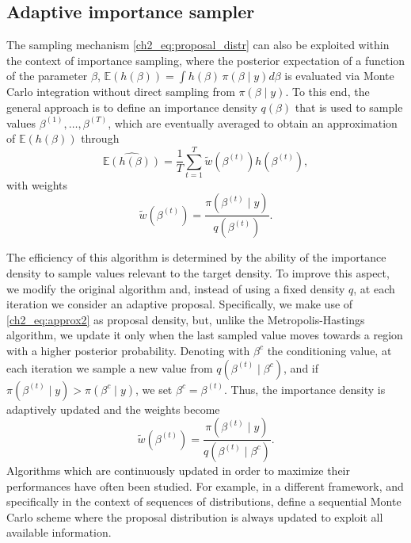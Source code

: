 \subsection{Adaptive importance sampler}
\label{ch2_sec:is}

The sampling mechanism \eqref{ch2_eq:proposal_distr} can also be exploited within the context of importance sampling, where the posterior expectation of a function of the parameter $\beta$, $\mathbb{E}\left( h(\beta) \right) = \int h(\beta)\, \pi(\beta \mid y) d\beta$ is evaluated via Monte Carlo integration without direct sampling from $\pi(\beta \mid y)$. To this end, the general approach is to define an importance density $q(\beta)$ that is used to sample values $\beta^{(1)}, \dots, \beta^{(T)}$, which are eventually averaged to obtain an approximation of $\mathbb{E}\left( h(\beta) \right)$ through
\[
\widehat{\mathbb{E}( h(\beta))} = \frac{1}{T} \sum_{t=1}^T \tilde{w}(\beta^{(t)}) h(\beta^{(t)}),
\]
with weights 
\begin{equation*}
\tilde{w}(\beta^{(t)}) = \frac{\pi(\beta^{(t)} \mid y)}{q(\beta^{(t)})}.
\end{equation*}

The efficiency of this algorithm is determined by the ability of the importance density to sample values relevant to the target density.
To improve this aspect, we modify the original algorithm and, instead of using a fixed density $q$, at each iteration we consider an adaptive proposal. Specifically, we make use of \eqref{ch2_eq:approx2} as proposal density, but, unlike the Metropolis-Hastings algorithm,  we update it only when the last sampled value moves towards a region with a higher posterior probability. Denoting with $\beta^{c}$ the conditioning value, at each iteration we sample a new value from $q(\beta^{(t)}\mid\beta^c)$, and if $\pi(\beta^{(t)}\mid y)>\pi(\beta^{c}\mid y)$, we set $\beta^{c} = \beta^{(t)}$. Thus, the importance density is adaptively updated and the weights become
\begin{equation*}
\tilde{w}(\beta^{(t)}) = \frac{\pi(\beta^{(t)} \mid y)}{q(\beta^{(t)} \mid \beta^{c})}.
\end{equation*}
Algorithms which are continuously updated in order to maximize their performances have often been studied. For example, in a different framework, and specifically in the context of sequences of distributions, \textcite{delMoral2006} define a sequential Monte Carlo scheme where the proposal distribution is always updated to exploit all available information.



